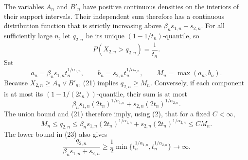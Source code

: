 The variables \(A_n\) and \(B'_n\) have positive continuous densities on the interiors of their support intervals. Their independent sum therefore has a continuous distribution function that is strictly increasing above \(\beta_ns_{1,n}+s_{2,n}\). For all sufficiently large \(n\), let \(q_{2,n}\) be its unique \((1-1/t_n)\)-quantile, so
\[
P(X_{2,n}>q_{2,n})=\frac1{t_n}.
\tag{21}
\]
Set
\[
a_n=\beta_ns_{1,n}t_n^{1/\alpha_{1,n}},
\qquad b_n=s_{2,n}t_n^{1/\alpha_{2,n}},
\qquad M_n=\max(a_n,b_n).
\tag{22}
\]
Because \(X_{2,n}\geq A_n\vee B'_n\), (21) implies \(q_{2,n}\geq M_n\). Conversely, if each component is at most its \((1-1/(2t_n))\)-quantile, their sum is at most
\[
\beta_ns_{1,n}(2t_n)^{1/\alpha_{1,n}}
+s_{2,n}(2t_n)^{1/\alpha_{2,n}}.
\]
The union bound and (21) therefore imply, using (2), that for a fixed \(C<\infty\),
\[
M_n\leq q_{2,n}
\leq\beta_ns_{1,n}(2t_n)^{1/\alpha_{1,n}}
+s_{2,n}(2t_n)^{1/\alpha_{2,n}}
\leq CM_n.
\tag{23}
\]
The lower bound in (23) also gives
\[
\frac{q_{2,n}}{\beta_ns_{1,n}+s_{2,n}}
\geq\frac12\min\{t_n^{1/\alpha_{1,n}},t_n^{1/\alpha_{2,n}}\}
\longrightarrow\infty.
\tag{24}
\]

